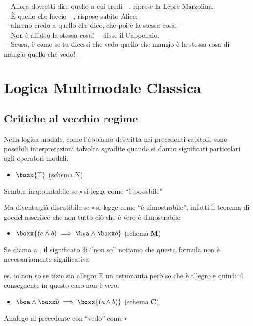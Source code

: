 \begin{savequote}[80mm]
---Allora dovresti dire quello a cui credi---, riprese la Lepre Marzolina. \\
---È quello che faccio---, rispose subito Alice; \\
---almeno credo a quello che dico, che poi è la stessa cosa.--- \\
---Non è affatto la stessa cosa!--- disse il Cappellaio. \\
---Scusa, è come se tu dicessi che vedo quello che mangio è la stessa cosa di mangio quello che vedo!---
 \end{savequote}


\chapter{Logica Multimodale Classica	}


\section{Critiche al vecchio regime}

Nella logica modale, come l'abbiamo descritta nei precedenti capitoli,
sono possibili interpretazioni talvolta sgradite quando si danno significati
particolari agli operatori modali.
\begin{itemize}
\item $\boxx{\top}$ (schema N)
\end{itemize}
Sembra inappuntabile se $\square$ si legge come ``è possibile'' 

Ma diventa già discutibile se $\square$ si legge come ``è dimostrabile'',
infatti il teorema di goedel asserisce che non tutto ciò che è vero
è dimostrabile
\begin{itemize}
\item $\boxx{(a\wedge b)\implies\boa\wedge\boxx b}$ (schema \textbf{M})
\end{itemize}
Se diamo a $\square$ il significato di ``non so'' notiamo che questa
formula non è necessariamente significativa 

es. io non so se tizio sia allegro E un astronauta però so che è allegro
e quindi il conseguente in questo caso non è vero.
\begin{itemize}
\item $\boa\wedge\boxx b\implies\boxx{(a\wedge b)}$ (schema \textbf{C})
\end{itemize}
Analogo al precedente con ``vedo'' come $\square$


